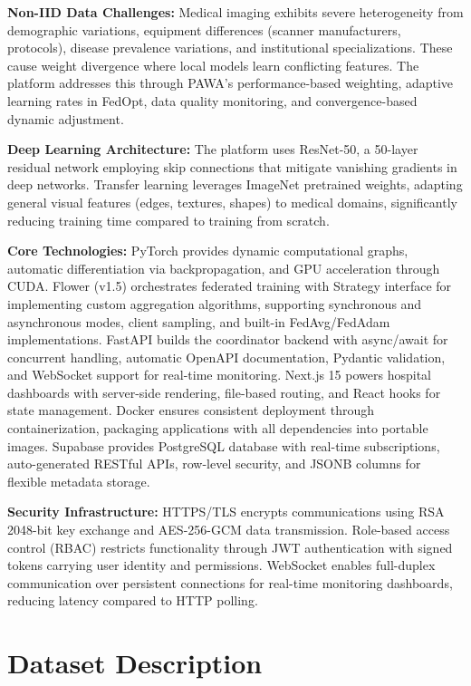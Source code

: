 \textbf{Non-IID Data Challenges:} Medical imaging exhibits severe heterogeneity from demographic variations, equipment differences (scanner manufacturers, protocols), disease prevalence variations, and institutional specializations. These cause weight divergence where local models learn conflicting features. The platform addresses this through PAWA's performance-based weighting, adaptive learning rates in FedOpt, data quality monitoring, and convergence-based dynamic adjustment.

\textbf{Deep Learning Architecture:} The platform uses ResNet-50, a 50-layer residual network employing skip connections that mitigate vanishing gradients in deep networks. Transfer learning leverages ImageNet pretrained weights, adapting general visual features (edges, textures, shapes) to medical domains, significantly reducing training time compared to training from scratch.

\textbf{Core Technologies:} PyTorch provides dynamic computational graphs, automatic differentiation via backpropagation, and GPU acceleration through CUDA. Flower (v1.5) orchestrates federated training with Strategy interface for implementing custom aggregation algorithms, supporting synchronous and asynchronous modes, client sampling, and built-in FedAvg/FedAdam implementations. FastAPI builds the coordinator backend with async/await for concurrent handling, automatic OpenAPI documentation, Pydantic validation, and WebSocket support for real-time monitoring. Next.js 15 powers hospital dashboards with server-side rendering, file-based routing, and React hooks for state management. Docker ensures consistent deployment through containerization, packaging applications with all dependencies into portable images. Supabase provides PostgreSQL database with real-time subscriptions, auto-generated RESTful APIs, row-level security, and JSONB columns for flexible metadata storage.

\textbf{Security Infrastructure:} HTTPS/TLS encrypts communications using RSA 2048-bit key exchange and AES-256-GCM data transmission. Role-based access control (RBAC) restricts functionality through JWT authentication with signed tokens carrying user identity and permissions. WebSocket enables full-duplex communication over persistent connections for real-time monitoring dashboards, reducing latency compared to HTTP polling.

\section{Dataset Description}

